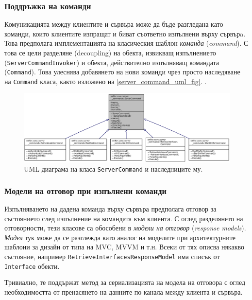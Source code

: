 \documentclass[12pt,a4paper,oneside]{book}
\begin{document}
\subsubsection{Поддръжка на команди}

Комуникацията между клиентите и сървъра може да бъде разгледана като команди,
които клиентите изпращат и биват съответно изпълнени върху сървърa.
Това предполага имплементацията на класическия шаблон \textit{команда}
(\textit{command}). С това
се цели разделяне (decoupling) на обекта, извикващ изпълнението
(\texttt{ServerCommandInvoker}) и обекта,
действително изпълняващ командата (\texttt{Command}). Това улеснява
добавянето на нови команди чрез просто наследяване на \texttt{Command} класа,
както изложено на \autoref{server_command_uml_fig}.  \cite{gamma_design_1995}.

\begin{figure}[h!]
  \centering
  \includegraphics[scale=.5]{figures/server_command_uml.eps}
  \caption{UML диаграма на класа \texttt{ServerCommand} и наследниците му.}
  \label{server_command_uml_fig}
\end{figure}

\subsubsection{Модели на отговор при изпълнени команди}

Изпълняването на дадена команда върху сървъра предполага отговор за състоянието
след изпълнение на командата към клиента. С оглед разделянето на отговорности,
тези класове са обособени в \textit{модели на отговор} (\textit{response models}).
\textit{Модел} тук може да се разглежда като
аналог на моделите при архитектурните шаблони за дизайн от типа на MVC, MVVM и
т.н. Всеки от тях описва някакво състояние, например
\texttt{RetrieveInterfacesResponseModel} има списък от \texttt{Interface}
обекти.

Тривиално, те поддържат метод за сериализацията на модела на отговора с оглед
необходимостта от пренасянето на данните по канала между клиента и сървъра.
\end{document}
